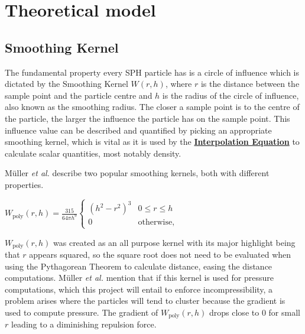 \documentclass[write-up.tex]{subfiles}
\begin{document}
\section{Theoretical model}
\subsection{Smoothing Kernel}

The fundamental property every SPH particle has is a circle of influence which is dictated by the Smoothing Kernel $W(r, h)$, where $r$ is the distance between the sample point and the particle centre and $h$ is the radius of the circle of influence, also known as the smoothing radius. The closer a sample point is to the centre of the particle, the larger the influence the particle has on the sample point. This influence value can be described and quantified by picking an appropriate smoothing kernel, which is vital as it is used by the \hyperlink{Interpolation Equation}{\textbf{Interpolation Equation}} to calculate scalar quantities, most notably density.

Müller \textit{et al.}\cite{muller} describe two popular smoothing kernels, both with different properties.

\begin{center}
$
    W_{\text{poly}}(r, h) = \displaystyle \frac{315}{64 \pi h^9}
    \begin{cases}
        (h^2-r^2)^3 & 0 \leq r \leq h \\
        0 & \text{otherwise},
    \end{cases}
$
\end{center}


$W_{\text{poly}}(r, h)$ was created as an all purpose kernel with its major highlight being that $r$ appears squared, so the square root does not need to be evaluated when using the Pythagorean Theorem to calculate distance, easing the distance computations. Müller \textit{et al.}\cite{muller} mention that if this kernel is used for pressure computations, which this project will entail to enforce incompressibility, a problem arises where the particles will tend to cluster because the gradient is used to compute pressure. The gradient of $W_{\text{poly}}(r, h)$ drops close to $0$ for small $r$ leading to a diminishing repulsion force.
\end{document}
